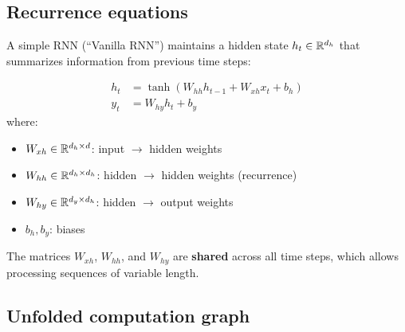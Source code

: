 \subsection{Recurrence equations}

A simple RNN (``Vanilla RNN'') maintains a hidden state
$h_t \in \mathbb{R}^{d_h}$ that summarizes information from previous time steps:

\begin{keyformulas}[title=\textbf{RNN -- Fundamental equations}]
\begin{align}
h_t &= \tanh(W_{hh} h_{t-1} + W_{xh} x_t + b_h)
\label{eq:rnn-hidden} \\
y_t &= W_{hy} h_t + b_y
\label{eq:rnn-output}
\end{align}
where:
\begin{itemize}
  \item $W_{xh} \in \mathbb{R}^{d_h \times d}$: input $\to$ hidden weights
  \item $W_{hh} \in \mathbb{R}^{d_h \times d_h}$: hidden $\to$ hidden weights (recurrence)
  \item $W_{hy} \in \mathbb{R}^{d_y \times d_h}$: hidden $\to$ output weights
  \item $b_h, b_y$: biases
\end{itemize}
\end{keyformulas}

\begin{remark}
The matrices $W_{xh}$, $W_{hh}$, and $W_{hy}$ are \textbf{shared} across
all time steps, which allows processing sequences of variable length.
\end{remark}

\subsection{Unfolded computation graph}

